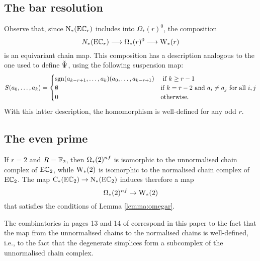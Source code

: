 


 \subsection{The bar resolution}\label{ss:milnor} Observe that, since $\operatorname{N}_*(\mathrm{E}\mathbb{C}_r)$ includes into $\Omega_*(r)^0$, the composition
 \[
    N_*(\mathrm{E}\mathbb{C}_r)\longrightarrow \Omega_*(r)^0\longrightarrow \mathrm{W}_*(r)
 \]
 is an equivariant chain map. This composition has a description analogous to the one used to define $\operatorname{\check{\Psi}}$, using the following suspension map:
  \[
	S(a_0,\ldots,a_k) = \begin{cases}
		{\operatorname*{sgn}(a_{k-r+1},\ldots,a_{k})} (a_{0},\ldots,a_{k-r+1}) & \text{ if $k\geq r-1$} \\
		\emptyset & \text{if $k = r-2$ and $a_i\neq a_j$ for all $i,j$} \\
		0 & \text{otherwise.}
	\end{cases}
\]
With this latter description, the homomorphism is well-defined for any odd $r$.
\subsection{The even prime}\label{ss:even} If $r= 2$ and $R=\mathbb{F}_2$, then $\Omega_*(2)^{nf}$ is isomorphic to the unnormalised chain complex of $\mathrm{E}\mathbb{C}_2$, while $\mathrm{W}_*(2)$ is isomorphic to the normalised chain complex of $\mathrm{E}\mathbb{C}_2$. The map $\operatorname{C}_*(\mathrm{E}\mathbb{C}_2)\to \operatorname{N}_*(\mathrm{E}\mathbb{C}_2)$ induces therefore a map
\[
    \Omega_*(2)^{nf}\to \mathrm{W}_*(2)
\]
that satisfies the conditions of Lemma \ref{lemma:omegar}.
\begin{remark}
    The combinatorics in pages 13 and 14 of \cite{medina2021fast_sq} correspond in this paper to the fact that the map from the unnormalised chains to the normalised chains is well-defined, i.e., to the fact that the degenerate simplices form a subcomplex of the unnormalised chain complex.
\end{remark}




